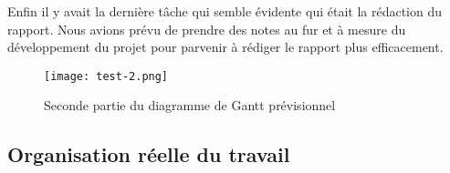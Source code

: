 \par
Enfin il y avait la dernière tâche qui semble évidente qui était la rédaction du rapport. Nous avions prévu de prendre des notes au fur et à mesure du développement du projet pour parvenir à rédiger le rapport plus efficacement.
\vfill
\begin{figure}[!h]
    \begin{center}
        \texttt{[image: test-2.png]}
        \caption{Seconde partie du diagramme de Gantt prévisionnel}
    \end{center}
\end{figure}






\subsection{Organisation réelle du travail}
